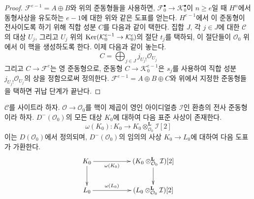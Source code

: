 \begin{proof}
\medskip\noindent
$\mathcal{F}^{e - 1} = A \oplus B$와 위의 준동형들을 사용하면,
$\mathcal{F}_0^\bullet \to \mathcal{K}_0^\bullet$이 $n \geq e$일 때
$H^n$에서 동형사상을 유도하는 $e - 1$에 대한 위와 같은 도표를 얻는다.
$H^{e - 1}$에서 이 준동형이 전사이도록 하기 위해 직합 성분 $C$를
다음과 같이 택한다. 집합 $J$, 각 $j \in J$에 대한 $\mathcal{C}$의
대상 $U_j$, 그리고 $U_j$ 위의
$\mathop{\mathrm{Ker}}(\mathcal{K}^{e - 1}_0 \to \mathcal{K}^e_0)$의 절단 $t_j$를
택하되, 이 절단들이 $\mathcal{O}_0$ 위에서 이 핵을 생성하도록 한다.
이제 다음과 같이 놓는다.
$$
C = \bigoplus\nolimits_{j \in J} j_{U_j!}\mathcal{O}_{U_j}
$$
그리고 $C \to \mathcal{F}^e$는 영 준동형으로, 준동형
$C \to \mathcal{K}_0^{e - 1}$은 $s_j$를 사용하여 직합 성분
$j_{U_j!}\mathcal{O}_{U_j}$의 상을 정함으로써 정의한다.
$\mathcal{F}^{e - 1} = A \oplus B \oplus C$와 위에서 지정한 준동형들을
택하면 귀납 단계가 끝난다.
\end{proof}

\begin{lemma}
\label{lemma-canonical-class}
$\mathcal{C}$를 사이트라 하자. $\mathcal{O} \to \mathcal{O}_0$를 핵이
제곱이 영인 아이디얼층 $\mathcal{I}$인 환층의 전사 준동형이라 하자.
$D^-(\mathcal{O}_0)$의 모든 대상 $K_0$에 대하여 다음 표준 사상이
존재한다.
$$
\omega(K_0) :
K_0 \longrightarrow
K_0 \otimes_{\mathcal{O}_0}^\mathbf{L} \mathcal{I}[2]
$$
이는 $D(\mathcal{O}_0)$에서 정의되며,
$D^-(\mathcal{O}_0)$의 임의의 사상 $K_0 \to L_0$에 대하여 다음 도표가
가환한다.
$$
\xymatrix{
K_0 \ar[d] \ar[rr]_-{\omega(K_0)} & &
(K_0 \otimes^\mathbf{L}_{\mathcal{O}_0} \mathcal{I})[2] \ar[d] \\
L_0 \ar[rr]^-{\omega(L_0)} & &
(L_0 \otimes^\mathbf{L}_{\mathcal{O}_0} \mathcal{I})[2]
}
$$
\end{lemma}

